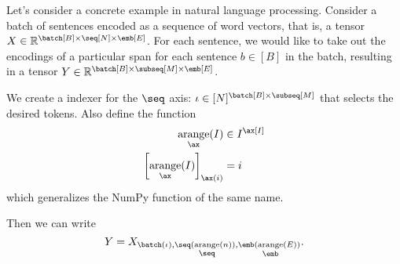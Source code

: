 
Let's consider a concrete example in natural language processing. Consider a batch of sentences encoded as a sequence of word vectors, that is, a tensor $X \in \mathbb{R}^{\batch[B] \times \seq[N] \times \emb[E]}$. For each sentence, we would like to take out the encodings of a particular span for each sentence $b \in [B]$ in the batch, resulting in a tensor $Y \in \mathbb{R}^{\batch[B] \times \subseq[M] \times \emb[E]}$.

We create a indexer for the $\seq$ axis: $\iota \in [N]^{\batch[B] \times \subseq[M]}$ that selects the desired tokens. Also define the function
\begin{align*}
  \nfun{\ax}{arange}(I) &\in I^{\ax[I]} \\
  \left[\nfun{\ax}{arange}(I)\right]_{\ax(i)} &= i
\end{align*}
which generalizes the NumPy function of the same name.

Then we can write
\begin{equation*}
  Y = X_{\batch(\iota), \seq(\nfun{\seq}{arange}(n)), \emb(\nfun{\emb}{arange}(E))}.
\end{equation*}

